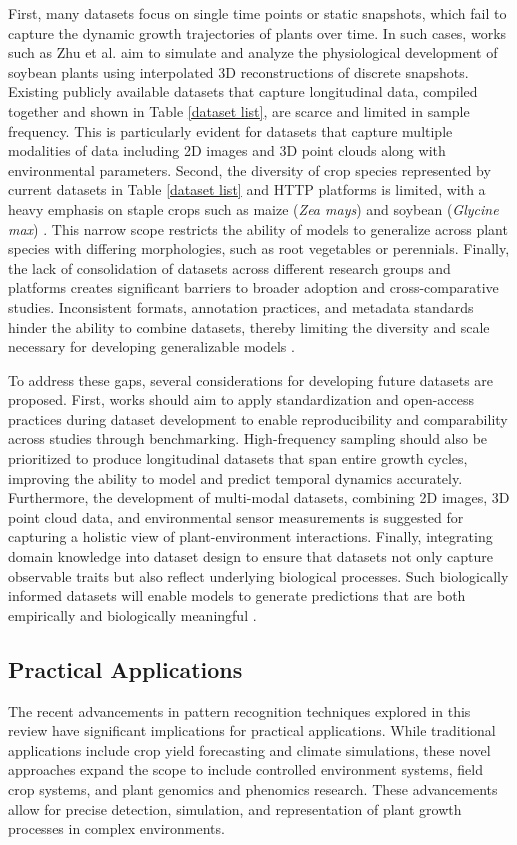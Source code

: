 \documentclass{article}
\begin{document}
First, many datasets focus on single time points or static snapshots, which fail to capture the dynamic growth trajectories of plants over time. In such cases, works such as Zhu et al. \cite{zhu2020analysing} aim to simulate and analyze the physiological development of soybean plants using interpolated 3D reconstructions of discrete snapshots. 
Existing publicly available datasets that capture longitudinal data, compiled together and shown in Table \ref{dataset list}, are  scarce and limited in sample frequency. 
This is particularly evident for datasets that capture multiple modalities of data including 2D images and 3D point clouds along with environmental parameters. 
Second, the diversity of crop species represented by current datasets in Table \ref{dataset list} and HTTP platforms is limited, with a heavy emphasis on staple crops such as maize (\textit{Zea mays}) and soybean (\textit{Glycine max}) \cite{s141120078}. 
This narrow scope restricts the ability of models to generalize across plant species with differing morphologies, such as root vegetables or perennials.
Finally, the lack of consolidation of datasets across different research groups and platforms creates significant barriers to broader adoption and cross-comparative studies. Inconsistent formats, annotation practices, and metadata standards hinder the ability to combine datasets, thereby limiting the diversity and scale necessary for developing generalizable models \cite{baab028}.

To address these gaps, several considerations for developing future datasets are proposed. First, works should aim to apply standardization and open-access practices during dataset development to enable reproducibility and comparability across studies through benchmarking. High-frequency sampling should also be prioritized to produce longitudinal datasets that span entire growth cycles, improving the ability to model and predict temporal dynamics accurately. Furthermore, the development of multi-modal datasets, combining 2D images, 3D point cloud data, and environmental sensor measurements is suggested for capturing a holistic view of plant-environment interactions. Finally, integrating domain knowledge into dataset design to ensure that datasets not only capture observable traits but also reflect underlying biological processes. Such biologically informed datasets will enable models to generate predictions that are both empirically and biologically meaningful \cite{schramowski2020making}.

\subsection{Practical Applications}
The recent advancements in pattern recognition techniques explored in this review have significant implications for practical applications. While traditional applications include crop yield forecasting and climate simulations, these novel approaches expand the scope to include controlled environment systems, field crop systems, and plant genomics and phenomics research. These advancements allow for precise detection, simulation, and representation of plant growth processes in complex environments.
\end{document}
